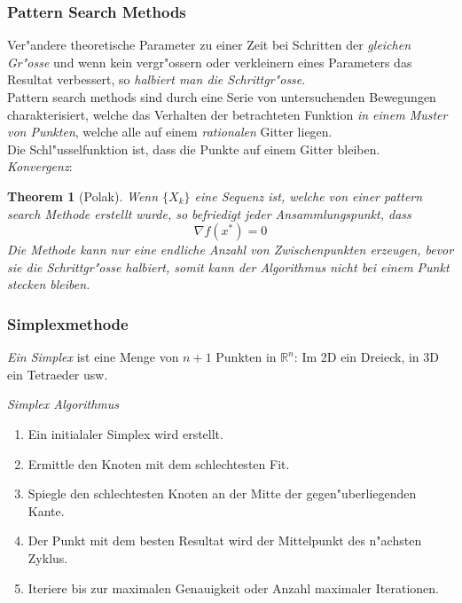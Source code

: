 \documentclass[german, 10pt, a4paper, twocolumn]{scrartcl}
\newtheorem{theorem}{Theorem}
\begin{document}
\subsubsection{Pattern Search Methods}


Ver"andere theoretische Parameter zu einer Zeit bei Schritten der \textit{gleichen Gr"osse} und wenn kein vergr"ossern oder verkleinern eines Parameters das Resultat verbessert, so \textit{halbiert man die Schrittgr"osse}.\\

Pattern search methods sind durch eine Serie von untersuchenden Bewegungen charakterisiert, welche das Verhalten der betrachteten Funktion \textit{in einem Muster von Punkten}, welche alle auf einem \textit{rationalen} Gitter liegen.\\

Die Schl"usselfunktion ist, dass die Punkte auf einem Gitter bleiben.\\

\textit{Konvergenz}:\\

\begin{theorem}[Polak]
Wenn $\{X_k\}$ eine Sequenz ist, welche von einer pattern search Methode erstellt wurde, so befriedigt jeder Ansammlungspunkt, dass
\begin{displaymath}
	\nabla f(x^*) = 0
\end{displaymath}
Die Methode kann nur eine endliche Anzahl von Zwischenpunkten erzeugen, bevor sie die Schrittgr"osse halbiert, somit kann der Algorithmus nicht bei einem Punkt stecken bleiben.
\end{theorem}

\subsubsection{Simplexmethode}

\textit{Ein Simplex} ist eine Menge von $n+1$ Punkten in $\mathbb{R}^n$: Im 2D ein Dreieck, in 3D ein Tetraeder usw.

\textit{Simplex Algorithmus}
	\begin{enumerate}
		\item Ein initialaler Simplex wird erstellt.
		\item Ermittle den Knoten mit dem schlechtesten Fit.
		\item Spiegle den schlechtesten Knoten an der Mitte der gegen"uberliegenden Kante.
		\item Der Punkt mit dem besten Resultat wird der Mittelpunkt des n"achsten Zyklus.
		\item Iteriere bis zur maximalen Genauigkeit oder Anzahl maximaler Iterationen.
	\end{enumerate}
\end{document}
